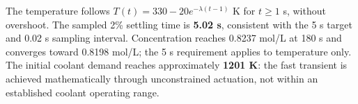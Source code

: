 The temperature follows $T(t)=330-20e^{-\lambda(t-1)}$ K for $t\ge1$ s, without overshoot. The sampled 2\% settling time is \textbf{5.02 s}, consistent with the 5 s target and 0.02 s sampling interval. Concentration reaches 0.8237 mol/L at 180 s and converges toward 0.8198 mol/L; the 5 s requirement applies to temperature only. The initial coolant demand reaches approximately \textbf{1201 K}: the fast transient is achieved mathematically through unconstrained actuation, not within an established coolant operating range.
